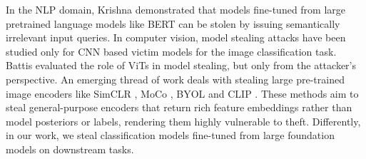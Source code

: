 %
In the NLP domain, Krishna \etal \cite{krishna2019thieves} demonstrated that models fine-tuned from large pretrained language models like BERT can be stolen by issuing semantically irrelevant input queries. In computer vision, model stealing attacks have been studied only for CNN based victim models for the image classification task. Battis \etal evaluated the role of ViTs in model stealing, but only from the attacker's perspective.  An emerging thread of work \cite{liu2022stolenencoder,dziedzic2022difficulty,sha2023can} deals with stealing large pre-trained image encoders like SimCLR \cite{chen2020simple}, MoCo \cite{he2020momentum}, BYOL \cite{grill2020bootstrap} and CLIP \cite{radford2021learning}. These methods aim to steal general-purpose encoders that return rich feature embeddings rather than model posteriors or labels, rendering them highly vulnerable to theft. Differently, in our work, we steal classification models fine-tuned from large foundation models on downstream tasks.
